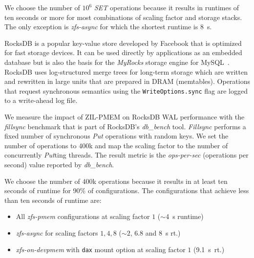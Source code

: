 \documentclass[12pt,a4paper,twoside]{book}
\begin{document}
\begin{description}[noitemsep,leftmargin=1.5cm,labelindent=1cm]
        We choose the number of $10^6$ \textit{SET} operations because it results in runtimes of ten seconds or more for most combinations of scaling factor and storage stacks.
        The only exception is \textit{zfs-async} for which the shortest runtime is 8~s.

    \item[RocksDB-fillsync] RocksDB is a popular key-value store developed by Facebook that is optimized for fast storage devices.
        It can be used directly by applications as an embedded database but is also the basis for the \textit{MyRocks} storage engine for MySQL~\cite{MyRocksRocksDBStorage}.
        RocksDB uses log-structured merge trees for long-term storage which are written and rewritten in large units that are prepared in DRAM (memtables).
        Operations that request synchronous semantics using the \lstinline{WriteOptions.sync} flag are logged to a write-ahead log file.~\cite{FlushWALLessFwrite,RocksDBGitHubWikiWalPerformance}

        We measure the impact of ZIL-PMEM on RocksDB WAL performance with the \textit{fillsync} benchmark that is part of RocksDB's \textit{db\_bench} tool.
        \textit{Fillsync} performs a fixed number of synchronous \textit{Put} operations with random keys.
        We set the number of operations to 400k and map the scaling factor to the number of concurrently \textit{Put}ting threads.
        The result metric is the \textit{ops-per-sec} (operations per second) value reported by \textit{db\_bench}.

        We choose the number of 400k operations because it results in at least ten seconds of runtime for 90\% of configurations.
        The configurations that achieve less than ten seconds of runtime are:
        \begin{itemize}[noitemsep]
            \item All \textit{zfs-pmem} configurations at scaling factor $1$ ($\sim$4~s runtime)
            \item \textit{zfs-async} for scaling factors $1, 4, 8$ (${\sim}2$, $6.8$ and 8~s rt.)
            \item \textit{xfs-on-devpmem} with \lstinline{dax} mount option at scaling factor $1$ (9.1~s~rt.)
        \end{itemize}
\end{description}
\end{document}
